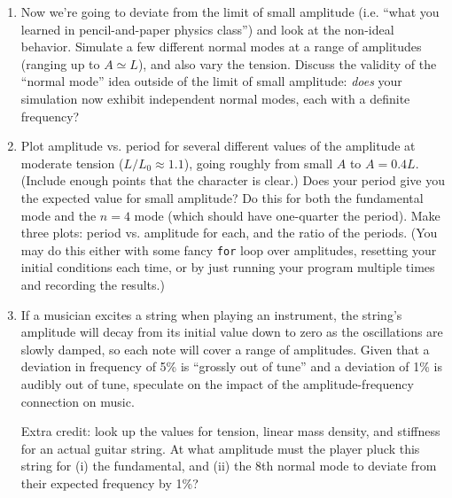 \documentclass[12pt]{article}
\begin{document}
\begin{enumerate}
{\it Note: This part may be modified in the next few weeks.}

\item{Now we're going to deviate from the limit of small amplitude (i.e. ``what you learned in pencil-and-paper physics class'') and look at the non-ideal behavior. Simulate a few different normal modes at a range of amplitudes (ranging up to $A \simeq L$), and also vary the tension.
Discuss the validity of the ``normal mode'' idea outside of the limit of small amplitude: {\it does} your simulation now exhibit independent normal modes, each with a definite frequency?}

\item{Plot amplitude vs. period for several different values of the amplitude at moderate tension ($L/L_0 \approx 1.1$), going roughly from small $A$ to $A=0.4L$. (Include enough points that the character is clear.) Does your period give you the expected value for small amplitude?
Do this for both the fundamental mode and the $n=4$ mode (which should have one-quarter the period). Make three plots: period vs. 
amplitude for each, and the ratio of the periods. (You may do this either with some fancy {\tt for} loop over amplitudes, resetting your initial conditions each time, or by just running your program multiple times and recording the results.)}

\item{If a musician excites a string when playing an instrument, the string's amplitude will decay from its initial value down to zero as the oscillations are slowly damped, so each note will cover a range of amplitudes. 
Given that a deviation in frequency of 5\% is ``grossly out of tune'' and a deviation of 1\% is audibly out of tune, speculate on the impact of the amplitude-frequency connection on music.

Extra credit: look up the values for tension, linear mass density, and stiffness for an actual guitar string.
At what amplitude must the player pluck this string for (i) the fundamental, and (ii) the 8th normal mode to deviate from 
their expected frequency by 1\%?}

 \end{enumerate}
\end{document}
